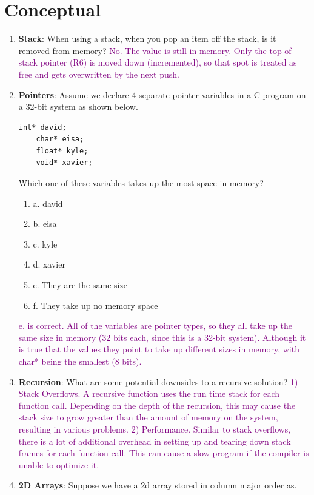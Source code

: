 \documentclass{article}
\begin{document}
\section{Conceptual}
\begin{enumerate}[label=(\alph*)]
    \item \textbf{Stack}: When using a stack, when you pop an item off the stack, is it removed from memory?
    \newline
    \textcolor{purple} {No. The value is still in memory. Only the top of stack pointer (R6) is moved down (incremented), so that spot is treated as free and gets overwritten by the next push.}
    \item \textbf{Pointers}: Assume we declare 4 separate pointer variables in a C program on a 32-bit system as shown below.
    \begin{lstlisting}[style=CStyle]
    int* david;
    char* eisa;
    float* kyle;
    void* xavier;
    \end{lstlisting}
    Which one of these variables takes up the most space in memory?
    \begin{enumerate}[label={}]
    \item a. david
    \item b. eisa
    \item c. kyle
    \item d. xavier
    \item e. They are the same size
    \item f. They take up no memory space
    \end{enumerate}
    \textcolor{purple}{ e. is correct. All of the variables are pointer types, so they all take up the same size in memory (32 bits each, since this is a 32-bit system). Although it is true that the values they point to take up different sizes in memory, with char* being the smallest (8 bits). 
    }
    \item \textbf{Recursion}: What are some potential downsides to a recursive solution?
    \textcolor{purple}{ 1) Stack Overflows. A recursive function uses the run time stack for each function call. Depending on the depth of the recursion, this may cause the stack size to grow greater than the amount of memory on the system, resulting in various problems.
    2) Performance. Similar to stack overflows, there is a lot of additional overhead in setting up and tearing down stack frames for each function call. This can cause a slow program if the compiler is unable to optimize it.}
    \item \textbf{2D Arrays}: Suppose we have a 2d array stored in column major order as. 

\end{enumerate}
\end{document}

